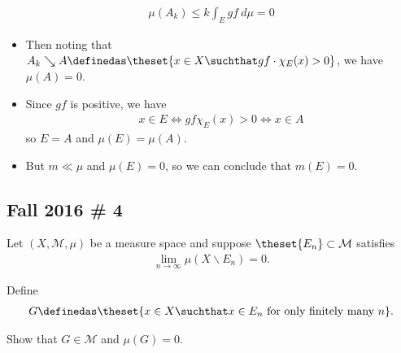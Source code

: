 \begin{solution}
\begin{align*}
\mu(A_k) \leq k \int_E gf ~d\mu = 0
\end{align*}

\begin{itemize}
\item
  Then noting that
  \(A_k \searrow A \definedas \theset{x\in X \suchthat gf\cdot \chi_E(x) > 0}\),
  we have \(\mu(A) = 0\).
\item
  Since \(gf\) is positive, we have
  \begin{align*}
  x\in E \iff gf\chi_E(x) > 0 \iff x\in A
  \end{align*} so \(E = A\) and \(\mu(E) = \mu(A)\).
\item
  But \(m \ll \mu\) and \(\mu(E) = 0\), so we can conclude that
  \(m(E) = 0\).
\end{itemize}

\end{solution}

\hypertarget{fall-2016-4}{%
\subsection{Fall 2016 \# 4}\label{fall-2016-4}}

Let \((X, \mathcal M, \mu)\) be a measure space and suppose
\(\theset{E_n} \subset \mathcal M\) satisfies
\begin{align*}
\lim _{n \rightarrow \infty} \mu\left(X \backslash E_{n}\right)=0.
\end{align*}

Define
\begin{align*}
G \definedas \theset{x\in X \suchthat x\in E_n \text{ for only finitely many  } n}.
\end{align*}

Show that \(G \in \mathcal M\) and \(\mu(G) = 0\).

